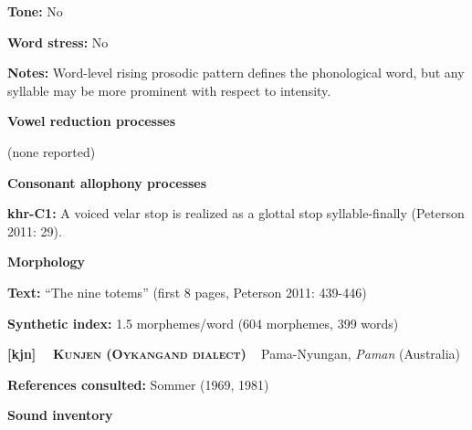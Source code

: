 \begin{styleBody}
\textbf{Tone:} No
\end{styleBody}

\begin{styleBody}
\textbf{Word stress:} No
\end{styleBody}

\begin{styleBody}
\textbf{Notes: }Word-level rising prosodic pattern defines the phonological word, but any syllable may be more prominent with respect to intensity.
\end{styleBody}

\begin{styleBody}
\textbf{Vowel reduction processes}
\end{styleBody}

\begin{styleBody}
(none reported)
\end{styleBody}

\begin{styleBody}
\textbf{Consonant allophony processes}
\end{styleBody}

\begin{styleBody}
\textbf{khr-C1: }A voiced velar stop is realized as a glottal stop syllable-finally (Peterson 2011: 29).
\end{styleBody}

\begin{styleBody}
\textbf{Morphology}
\end{styleBody}

\begin{styleBody}
\textbf{Text:} “The nine totems” (first 8 pages, Peterson 2011: 439-446)
\end{styleBody}

\begin{styleBody}
\textbf{Synthetic index: }1.5 morphemes/word (604 morphemes, 399 words)
\end{styleBody}

\clearpage\begin{styleBody}
\textbf{[kjn] }\ \ \textbf{\textsc{Kunjen (Oykangand dialect)}}\textbf{\ \ }Pama-Nyungan, \textit{Paman} (Australia)
\end{styleBody}

\begin{styleBody}
\textbf{References consulted: }Sommer (1969, 1981)
\end{styleBody}

\begin{styleBody}
\textbf{Sound inventory}
\end{styleBody}

